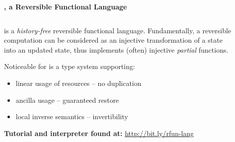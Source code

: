 \documentclass[final]{beamer}
\newlength{\sepwid}
\newlength{\onecolwid}
\newlength{\twocolwid}
\begin{document}
\begin{frame}[t]
\begin{columns}[t,onlytextwidth]
\begin{column}{\twocolwid} %


\textbf{\large \rfun, a Reversible Functional Language}

\begin{columns}[t,onlytextwidth]

\begin{column}{\onecolwid} %
  \begin{block}{}
  \vspace{-22mm}
  \rfun \cite{YokoyamaAxelsenGlueck:2012:LNCS,KaarsgaardThomsen:2017:NWPT} is a \emph{history-free} reversible functional language. Fundamentally, a reversible computation can be considered as an injective transformation of a state into an updated state, thus \rfun implements (often) injective \emph{partial} functions.

  Noticeable for \rfun is a type system supporting:
\begin{itemize}
  \item linear usage of resources -- no duplication
  \item ancilla usage -- guaranteed restore
  \item local inverse semantics -- invertibility
\end{itemize}


\textbf{Tutorial and interpreter found at:}
\url{http://bit.ly/rfun-lang}


  \end{block}
\end{column}


\begin{column}{\sepwid}~\end{column} %

\begin{column}{\onecolwid} %

\RevRFunPlus

~

\RevRFunMap



\end{column}
\end{columns}
\end{column}
\end{columns}
\end{frame}
\end{document}
